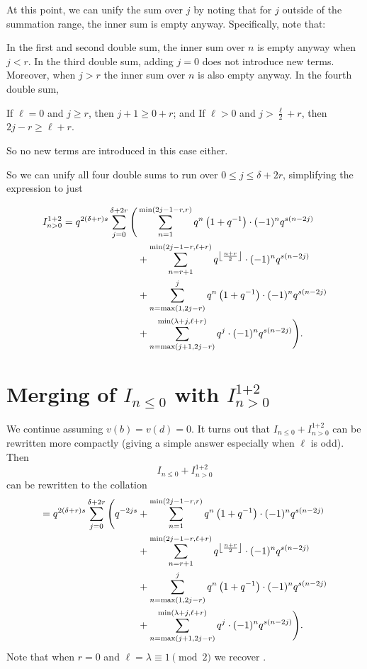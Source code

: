 At this point, we can unify the sum over $j$ by noting that for $j$ outside of the
summation range, the inner sum is empty anyway.
Specifically, note that:
\begin{itemize}
  \ii In the first and second double sum,
  the inner sum over $n$ is empty anyway when $j < r$.
  \ii In the third double sum, adding $j=0$ does not introduce new terms.
  Moreover, when $j > r$ the inner sum over $n$ is also empty anyway.
  \ii In the fourth double sum,
  \begin{itemize}
    \ii If $\ell = 0$ and $j \ge r$, then $j+1 \ge 0+r$; and
    \ii If $\ell > 0$ and $j > \frac{\ell}{2} + r$, then $2j-r \ge \ell+r$.
  \end{itemize}
  So no new terms are introduced in this case either.
\end{itemize}
So we can unify all four double sums to run over $0 \le j \le \delta + 2r$,
simplifying the expression to just

\begin{align*}
  I_{n > 0}^{\text{1+2}}
  = q^{2(\delta+r)s}
  \sum_{j = 0}^{\delta + 2r} \Bigg(
    & \sum_{n=1}^{\min(2j-1-r, r)}
      q^{n} \left( 1 + q^{-1} \right) \cdot (-1)^n q^{s(n-2j)} \\
    & + \sum_{n=r+1}^{\min(2j-1-r, \ell+r)}
      q^{\left\lfloor \frac{n+r}{2} \right\rfloor} \cdot (-1)^n q^{s(n-2j)} \\
    &+ \sum_{n=\max(1,2j-r)}^{j}
      q^{n} \left( 1 + q^{-1} \right) \cdot (-1)^n q^{s(n-2j)} \\
    &+ \sum_{n=\max(j+1, 2j-r)}^{\min(\lambda+j, \ell+r)} q^{j} \cdot (-1)^n q^{s(n-2j)} \Bigg).
\end{align*}

\section{Merging of $I_{n \le 0}$ with $I_{n > 0}^{\text{1+2}}$}
We continue assuming $v(b) = v(d) = 0$.
It turns out that $I_{n \le 0} + I_{n > 0}^{\text{1+2}}$ can be rewritten more compactly
(giving a simple answer especially when $\ell$ is odd).
Then
\[
  I_{n \le 0} + I_{n > 0}^{\text{1+2}}
\]
can be rewritten to the collation
\begin{align*}
  = q^{2(\delta+r)s}
  \sum_{j = 0}^{\delta + 2r} \Bigg(
    q^{-2js}
    &+ \sum_{n=1}^{\min(2j-1-r, r)}
      q^{n} \left( 1 + q^{-1} \right) \cdot (-1)^n q^{s(n-2j)} \\
    &+ \sum_{n=r+1}^{\min(2j-1-r, \ell+r)}
      q^{\left\lfloor \frac{n+r}{2} \right\rfloor} \cdot (-1)^n q^{s(n-2j)} \\
    &+ \sum_{n=\max(1,2j-r)}^{j}
      q^{n} \left( 1 + q^{-1} \right) \cdot (-1)^n q^{s(n-2j)} \\
    &+ \sum_{n=\max(j+1, 2j-r)}^{\min(\lambda+j, \ell+r)} q^{j} \cdot (-1)^n q^{s(n-2j)} \Bigg).
\end{align*}
Note that when $r=0$ and $\ell = \lambda \equiv 1 \pmod 2$
we recover \cite[equation (4.13)]{ref:AFL}.

